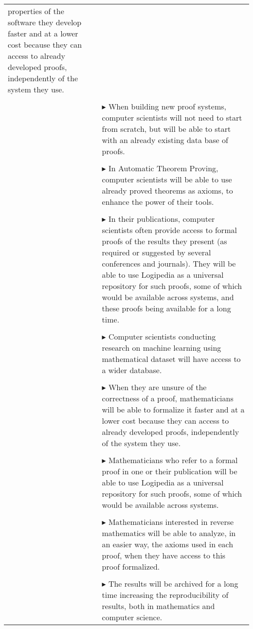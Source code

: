 \begin{longtable}{|p{}|p{}|}
  properties of the software they develop faster and at a lower cost
  because they can access to already developed proofs, independently
  of the system they use.
\\
&\\
&
$\blacktriangleright$ When building new proof systems, computer scientists will not
  need to start from scratch, but will be able to start with an already
  existing data base of proofs.
\\
&\\
&
$\blacktriangleright$ In Automatic Theorem Proving, computer scientists will be able
  to use already proved theorems as axioms, to enhance the power of
  their tools.
\\
&\\
&
$\blacktriangleright$ In their publications, computer scientists often provide access
  to formal proofs of the results they present (as required or
  suggested by several conferences and journals). They will be able to
  use Logipedia as a universal repository for such proofs, some of
  which would be available across systems, and these proofs being
  available for a long time.
\\
&\\
&
$\blacktriangleright$ Computer scientists conducting research on machine learning
  using mathematical dataset will have access to a wider database.
\\
&\\
&
$\blacktriangleright$ When they are unsure of the correctness of a proof,
  mathematicians will be able to formalize it faster and at a lower
  cost because they can access to already developed proofs,
  independently of the system they use.
\\
&\\
&
$\blacktriangleright$ Mathematicians who refer to a formal proof in one or their
  publication will be able to use Logipedia as a universal
  repository for such proofs, some of which would be available across
  systems.
\\
&\\
&
$\blacktriangleright$ Mathematicians interested in reverse mathematics will be able to
  analyze, in an easier way, the axioms used in each proof, when they
  have access to this proof formalized.
\\
&\\
&
$\blacktriangleright$ The results will be archived for a long time increasing the
  reproducibility of results, both in mathematics and computer science.
\\

\end{longtable}
